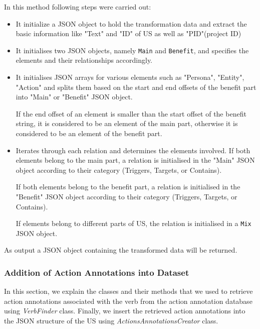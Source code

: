 \begin{itemize}
	In this method following steps were carried out:
	\begin{itemize}
		\item It initialize a JSON object to hold the transformation data and extract the basic information like "Text" and "ID" of US as well as "PID"(project ID)
		
		\item It initialises two JSON objects, namely \texttt{Main} and \texttt{Benefit}, and specifies the elements and their relationships accordingly.
		
		\item It initialises JSON arrays for various elements such as "Persona", "Entity", "Action" and splits them based on the start and end offsets of the benefit part into "Main" or "Benefit" JSON object.
		
		If the end offset of an element is smaller than the start offset of the benefit string, it is considered to be an element of the main part, otherwise it is considered to be an element of the benefit part.
		
		\item Iterates through each relation and determines the elements involved. If both elements belong to the main part, a relation is initialised in the "Main" JSON object according to their category (Triggers, Targets, or Contains). 
		
		If both elements belong to the benefit part, a relation is initialised in the "Benefit" JSON object according to their category (Triggers, Targets, or Contains). 
		
		If elements belong to different parts of US, the relation is initialised in a \texttt{Mix} JSON object.
		
	\end{itemize}
	As output a JSON object containing the transformed data will be returned.
\end{itemize}
\subsubsection*{Addition of Action Annotations into Dataset}\label{conflict_action_annotation}
In this section, we explain the classes and their methods that we used to retrieve action annotations associated with the verb from the action annotation database using \textit{VerbFinder} class. Finally, we insert the retrieved action annotations into the JSON structure of the US using \textit{ActionsAnnotationsCreator} class.
